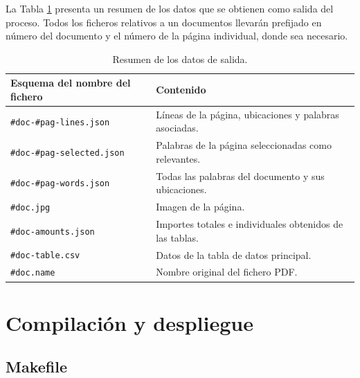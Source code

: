 





La Tabla \ref{tab:datos-de-salida} presenta un resumen de los datos que se obtienen como salida del proceso. Todos los ficheros relativos a un documentos llevarán prefijado en número del documento y el número de la página individual, donde sea necesario.

\begin{table}[ht]
    \centering
    \begin{tabular}{l l}
        Esquema del nombre del fichero & Contenido \\
        \hline
        \hline
        \verb|#doc-#pag-lines.json| & Líneas de la página, ubicaciones y palabras asociadas. \\
        \verb|#doc-#pag-selected.json| & Palabras de la página seleccionadas como relevantes. \\
        \verb|#doc-#pag-words.json| & Todas las palabras del documento y sus ubicaciones. \\
        \verb|#doc.jpg| & Imagen de la página. \\
        \verb|#doc-amounts.json| & Importes totales e individuales obtenidos de las tablas. \\
        \verb|#doc-table.csv| & Datos de la tabla de datos principal. \\
        \verb|#doc.name| & Nombre original del fichero PDF.\\
    \end{tabular}
    \caption{Resumen de los datos de salida.}    
    \label{tab:datos-de-salida}
\end{table}

\section{Compilación y despliegue}

\subsection{Makefile}


